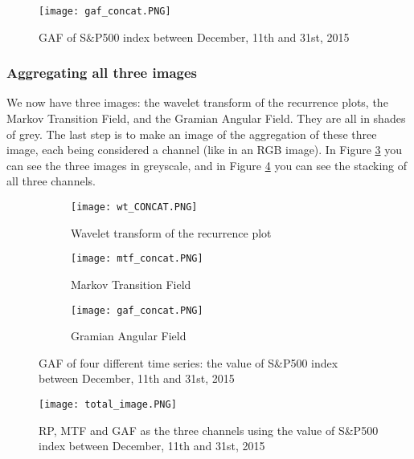 \documentclass[11pt]{article}
\begin{document}
\begin{onehalfspace}
\begin{figure}[h!]
    \centering
    \captionsetup{justification=centering}
    \texttt{[image: gaf\_concat.PNG]}
    \caption{GAF of S\&P500 index between December, 11th and 31st, 2015}
\label{fig:gaf_concat}
\end{figure}

\subsubsection{Aggregating all three images}

We now have three images: the wavelet transform of the recurrence plots, the Markov Transition Field, and the Gramian Angular Field. They are all in shades of grey. The last step is to make an image of the aggregation of these three image, each being considered a channel (like in an RGB image). In Figure \ref{fig:3channels} you can see the three images in greyscale, and in Figure \ref{fig:final_image} you can see the stacking of all three channels. 

\begin{figure}[h!]
    \centering
    \captionsetup{justification=centering}
    \begin{subfigure}{0.32\textwidth}
        \texttt{[image: wt\_CONCAT.PNG]}
        \caption{Wavelet transform of the recurrence plot}
        \label{fig:open_concat}
    \end{subfigure}
    \begin{subfigure}{0.32\textwidth}
        \texttt{[image: mtf\_concat.PNG]}
        \caption{Markov Transition Field}
    \end{subfigure}
    \begin{subfigure}{0.32\textwidth}
        \texttt{[image: gaf\_concat.PNG]}
        \caption{Gramian Angular Field}
    \end{subfigure}    
    \caption{GAF of four different time series: the value of S\&P500 index between December, 11th and 31st, 2015}
    \label{fig:3channels}
\end{figure}

\begin{figure}[h!]
    \centering
    \captionsetup{justification=centering}
    \texttt{[image: total\_image.PNG]}
    \caption{RP, MTF and GAF as the three channels using the value of S\&P500 index between December, 11th and 31st, 2015}
\label{fig:final_image}
\end{figure}


\end{onehalfspace}
\end{document}
